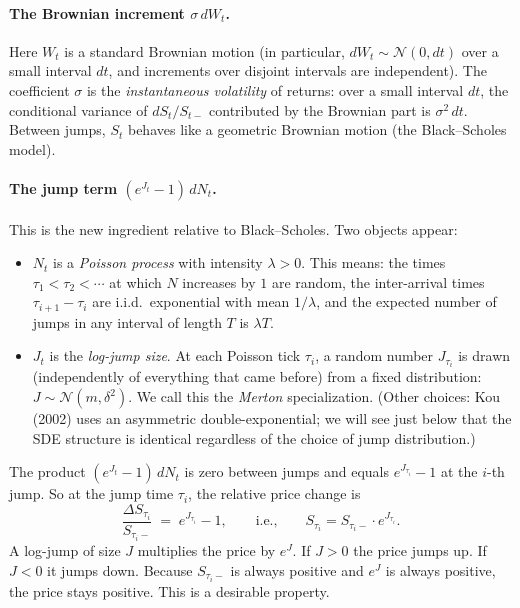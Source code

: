 \documentclass[11pt]{article}
\theoremstyle{definition}
\theoremstyle{remark}
\newcommand{\1}{\mathbf{1}}
\begin{document}
\paragraph{The Brownian increment $\sigma\,dW_t$.} Here $W_t$ is a standard Brownian motion (in particular, $dW_t \sim \mathcal{N}(0, dt)$ over a small interval $dt$, and increments over disjoint intervals are independent). The coefficient $\sigma$ is the \emph{instantaneous volatility} of returns: over a small interval $dt$, the conditional variance of $dS_t / S_{t-}$ contributed by the Brownian part is $\sigma^2\,dt$. Between jumps, $S_t$ behaves like a geometric Brownian motion (the Black–Scholes model).

\paragraph{The jump term $(e^{J_t} - 1)\,dN_t$.}
This is the new ingredient relative to Black–Scholes. Two objects appear:
\begin{itemize}[leftmargin=2em]
\item $N_t$ is a \emph{Poisson process} with intensity $\lambda > 0$. This means: the times $\tau_1 < \tau_2 < \cdots$ at which $N$ increases by $1$ are random, the inter-arrival times $\tau_{i+1} - \tau_i$ are i.i.d.\ exponential with mean $1/\lambda$, and the expected number of jumps in any interval of length $T$ is $\lambda T$.
\item $J_t$ is the \emph{log-jump size}. At each Poisson tick $\tau_i$, a random number $J_{\tau_i}$ is drawn (independently of everything that came before) from a fixed distribution: $J \sim \mathcal{N}(m, \delta^2)$. We call this the \emph{Merton} specialization. (Other choices: Kou (2002) uses an asymmetric double-exponential; we will see just below that the SDE structure is identical regardless of the choice of jump distribution.)
\end{itemize}

The product $(e^{J_t} - 1)\,dN_t$ is zero between jumps and equals $e^{J_{\tau_i}} - 1$ at the $i$-th jump. So at the jump time $\tau_i$, the relative price change is
\[
\frac{\Delta S_{\tau_i}}{S_{\tau_i-}} \;=\; e^{J_{\tau_i}} - 1, \qquad \text{i.e.,}\qquad S_{\tau_i} = S_{\tau_i-}\cdot e^{J_{\tau_i}}.
\]
A log-jump of size $J$ multiplies the price by $e^J$. If $J > 0$ the price jumps up. If $J < 0$ it jumps down. Because $S_{\tau_i-}$ is always positive and $e^J$ is always positive, the price stays positive. This is a desirable property.
\end{document}
